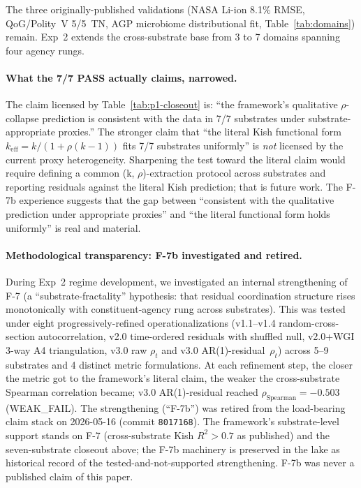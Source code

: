 \documentclass[11pt,a4paper]{article}
\begin{document}
The three originally-published validations (NASA Li-ion 8.1\% RMSE, QoG/Polity~V 5/5~TN, AGP microbiome distributional fit, Table~\ref{tab:domains}) remain. Exp~2 extends the cross-substrate base from 3 to 7 domains spanning four agency rungs.

\paragraph{What the 7/7 PASS actually claims, narrowed.} The claim licensed by Table~\ref{tab:p1-closeout} is: ``the framework's qualitative $\rho$-collapse prediction is consistent with the data in 7/7 substrates under substrate-appropriate proxies.'' The stronger claim that ``the literal Kish functional form $k_{\text{eff}} = k/(1+\rho(k-1))$ fits 7/7 substrates uniformly'' is \emph{not} licensed by the current proxy heterogeneity. Sharpening the test toward the literal claim would require defining a common (k, $\rho$)-extraction protocol across substrates and reporting residuals against the literal Kish prediction; that is future work. The F-7b experience suggests that the gap between ``consistent with the qualitative prediction under appropriate proxies'' and ``the literal functional form holds uniformly'' is real and material.

\paragraph{Methodological transparency: F-7b investigated and retired.} During Exp~2 regime development, we investigated an internal strengthening of F-7 (a ``substrate-fractality'' hypothesis: that residual coordination structure rises monotonically with constituent-agency rung across substrates). This was tested under eight progressively-refined operationalizations (v1.1--v1.4 random-cross-section autocorrelation, v2.0 time-ordered residuals with shuffled null, v2.0+WGI 3-way A4 triangulation, v3.0 raw $\rho_t$ and v3.0 AR(1)-residual~$\rho_t$) across 5--9 substrates and 4 distinct metric formulations. At each refinement step, the closer the metric got to the framework's literal claim, the weaker the cross-substrate Spearman correlation became; v3.0 AR(1)-residual reached $\rho_{\text{Spearman}} = -0.503$ (WEAK\_FAIL). The strengthening (``F-7b'') was retired from the load-bearing claim stack on 2026-05-16 (commit \texttt{8017168}). The framework's substrate-level support stands on F-7 (cross-substrate Kish $R^2 > 0.7$ as published) and the seven-substrate closeout above; the F-7b machinery is preserved in the lake as historical record of the tested-and-not-supported strengthening. F-7b was never a published claim of this paper.
\end{document}
